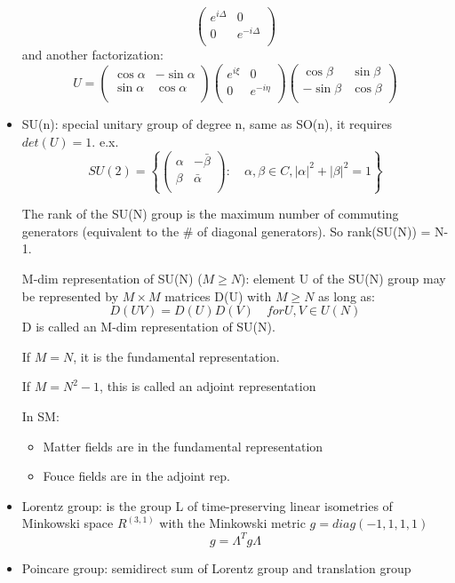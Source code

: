 \begin{itemize}
\begin{equation*}
\begin{pmatrix}
		e^{i\Delta} & 0	\\
		0   & e^{-i\Delta}  \\
	    \end{pmatrix}
	\end{equation*}
	and another factorization:
	\begin{equation*}
	    U =
	    \begin{pmatrix}
		\cos\alpha  & -\sin\alpha    \\
		\sin\alpha & \cos\alpha    \\
	    \end{pmatrix}
	    \begin{pmatrix}
		e^{i\xi}   & 0	\\
		0   & e^{-i\eta}    \\
	    \end{pmatrix}
	    \begin{pmatrix}
		\cos\beta  & \sin\beta    \\
		-\sin\beta & \cos\beta    \\
	    \end{pmatrix}
	\end{equation*}
    \item SU(n): special unitary group of degree n, same as SO(n), it requires
	$det(U) = 1$. e.x.
	\begin{equation*}
	 SU(2) = \left\{ 
	    \begin{pmatrix}
		\alpha	& -\bar{\beta}	\\
		\beta	& \bar{\alpha}	\\
	    \end{pmatrix}
	    : \quad
	    \alpha, \beta \in C, |\alpha|^2 + |\beta|^2 = 1
	\right\}
	\end{equation*}

	The rank of the SU(N) group is the maximum number of commuting 
	generators (equivalent to the \# of diagonal generators). So
	rank(SU(N)) = N-1.

	M-dim representation of SU(N) ($M\ge N$): element U of the SU(N) group 
	may be represented by $M \times M$ matrices D(U) with $M\ge N$ as long as:
	$$ D(UV) = D(U)D(V) \quad for U, V \in U(N) $$
	D is called an M-dim representation of SU(N).

	If $M=N$, it is the fundamental representation.

	If $M = N^2 -1$, this is called an adjoint representation

	In SM:
	\begin{itemize}
	    \item Matter fields are in the fundamental representation
	    \item Fouce fields are in the adjoint rep.
	\end{itemize}

    \item Lorentz group: is the group L of time-preserving linear isometries 
	of Minkowski space $R^{(3,1)}$ with the Minkowski metric $g= diag(-1, 1, 1, 1)$
	$$ g = \Lambda^T g \Lambda $$
    \item Poincare group: semidirect sum of Lorentz group and translation group
\end{itemize}


